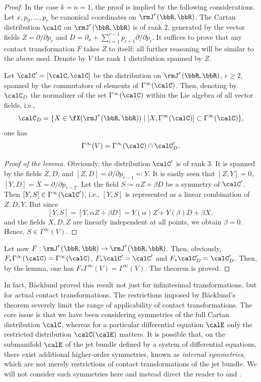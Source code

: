 \begin{proof}
    In the case $k=n=1$, the proof is implied by the following considerations. Let $x,p_0,\ldots,p_r$ be canonical coordinates on $\rmJ^r(\bbR,\bbR)$. The Cartan distribution $\calC$ on $\rmJ^r(\bbR,\bbR)$ is of rank $2$, generated by the vector fields $Z=\partial/\partial p_r$ and $D=\partial_x+\sum_{i=1}^{r-1}p_{i+1}\partial/\partial p_i$. It suffices to prove that any contact transformation $F$ takes $Z$ to itself; all further reasoning will be similar to the above used. Denote by $V$ the rank $1$ distribution spanned by $Z$.

    \begin{lem}
        Let $\calC'=[\calC,\calC]$ be the distribution on $\rmJ^r(\bbR,\bbR)$, $r\geq 2$, spanned by the commutators of elements of $\Gamma^\infty(\calC)$. Then, denoting by $\calC_D$ the normalizer of the set $\Gamma^\infty(\calC)$ within the Lie algebra of all vector fields, i.e.,
        \[\calC_D=\{X\in \fX(\rmJ^r(\bbR,\bbR))\mid [X,\Gamma^\infty(\calC)]\subset  \Gamma^\infty(\calC)\},\]
        one has 
        \[\Gamma^\infty(V)=\Gamma^\infty(\calC)\cap \calC_D'.\]
    \end{lem}
    \begin{proof}[Proof of the lemma]
        Obviously, the distribution $\calC'$ is of rank $3$. It is spanned by the fields $Z,D$, and $[Z,D]=\partial/\partial p_{r-1}\eqqcolon Y$. It is easily seen that $[Z,Y]=0$, $[Y,D]=X=\partial/\partial p_{r-2}$. Let the field $S\coloneqq \alpha Z+\beta D$ be a symmetry of $\calC'$. Then $[Y,S]\in\Gamma^\infty(\calC')$, i.e., $[Y,S]$ is represented as a linear combination of $Z,D,Y$. But since 
        \[[Y,S]=[Y,\alpha Z+\beta D]=Y(\alpha)Z+Y(\beta)D+\beta X,\]
        and the fields $X,D,Z$ are linearly independent at all points, we obtain $\beta=0$. Hence, $S\in\Gamma^\infty(V)$.
    \end{proof}
    Let now $F:\rmJ^r(\bbR,\bbR)\to \rmJ^r(\bbR,\bbR)$. Then, obviously, $F_\ast \Gamma^\infty(\calC)=\Gamma^\infty(\calC)$, $F_\ast\calC'=\calC'$ and $F_\ast \calC_D'=\calC_D'$. Then, by the lemma, one has $F_\ast \Gamma^\infty(V)=\Gamma^\infty(V)$. The theorem is proved.
\end{proof}

\begin{rem}
    In fact, B\"acklund proved this result not just for infinitesimal transformations, but for actual contact transformations. The restrictions imposed by B\"acklund's theorem severely limit the range of applicability of contact transformations. The core issue is that we have been considering symmetries of the full Cartan distribution $\calC$, whereas for a particular differential equation $\calE$ only the restricted distribution $\calC(\calE)$ matters. It is possible that, on the submanifold $\calE$ of the jet bundle defined by a system of differential equations, there exist additional higher-order symmetries, known as \emph{internal symmetries}, which are not merely restrictions of contact transformations of the jet bundle. We will not consider such symmetries here and instead direct the reader to \cite[\S3.7]{Kras} and \cite{Olver}.
\end{rem}


